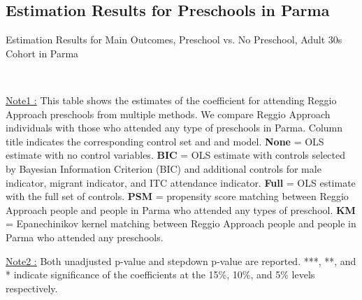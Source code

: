 \subsection{Estimation Results for Preschools in Parma}




\begin{table}[H] \caption{Estimation Results for Main Outcomes, Preschool vs. No Preschool, Adult 30s Cohort in Parma} \label{ols-M-adult30-reg-pres-parma}
\scalebox{0.62}{}
\vspace{1ex} \\
\footnotesize\raggedright{\underline{Note1 :} This table shows the estimates of the coefficient for attending Reggio Approach preschools from multiple methods. We compare Reggio Approach individuals with those who attended any type of preschools in Parma. Column title indicates the corresponding control set and and model. \textbf{None} = OLS estimate with no control variables. \textbf{BIC} = OLS estimate with controls selected by Bayesian Information Criterion (BIC) and additional controls for male indicator, migrant indicator, and ITC attendance indicator. \textbf{Full} = OLS estimate with the full set of controls. \textbf{PSM} =  propensity score matching between Reggio Approach people and people in Parma who attended any types of preschool. \textbf{KM} = Epanechinikov kernel matching between Reggio Approach people and people in Parma who attended any preschools.}

\footnotesize\raggedright{\underline{Note2 :} Both unadjusted p-value and stepdown p-value are reported. ***, **, and * indicate significance of the coefficients at the 15\%, 10\%, and 5\% levels respectively.}
\end{table}




